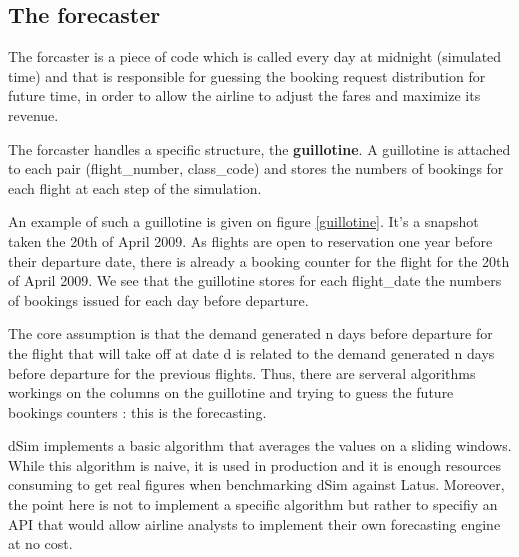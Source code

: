 \documentclass[11pt]{JHEP3}
\begin{document}
\subsection{The forecaster}

The forcaster is a piece of code which is called every day at midnight (simulated time) and that is responsible for guessing the booking request distribution for future time, in order to allow the airline to adjust the fares and maximize its revenue.

The forcaster handles a specific structure, the \textbf{guillotine}. A guillotine is attached to each pair (flight\_number, class\_code) and stores the numbers of bookings for each flight at each step of the simulation. 


An example of such a guillotine is given on figure \ref{guillotine}. It's a snapshot taken the 20th of April 2009. As flights are open to reservation one year before their departure date, there is already a booking counter for the flight for the 20th of April 2009. We see that the guillotine stores for each flight\_date the numbers of bookings issued for each day before departure.

The core assumption is that the demand generated n days before departure for the flight that will take off at date d is related to the demand generated n days before departure for the previous flights. Thus, there are serveral algorithms workings on the columns on the guillotine and trying to guess the future bookings counters : this is the forecasting.

dSim implements a basic algorithm that averages the values on a sliding windows. While this algorithm is naive, it is used in production and it is enough resources consuming to get real figures when benchmarking dSim against Latus. Moreover, the point here is not to implement a specific algorithm but rather to specifiy an API that would allow airline analysts to implement their own forecasting engine at no cost.
\end{document}
